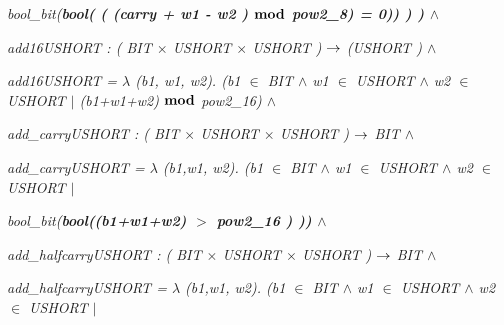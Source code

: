 \documentclass[11pt]{article}
\begin{document}
\begin{sloppypar}
\hspace*{0.60in}\it bool\_bit\rm (\bf bool\rm ( \rm ( \rm (\it carry \rm + \it w1 \rm - \it w2 \rm )  $\mod$  \it pow2\_8\rm ) \rm = \rm 0\rm )\rm ) \rm ) \rm )\hspace*{0.10in} $\land$ 

\hspace*{0.20in}

\hspace*{0.20in}

\hspace*{0.20in}\it add16USHORT \rm : \rm ( \it BIT  $\times$  \it USHORT  $\times$  \it USHORT \rm )  $\fun$  \rm (\it USHORT \rm )  $\land$ 

\hspace*{0.20in}\it add16USHORT \rm =  $\lambda$  \rm (\it b1\rm , \it w1\rm , \it w2\rm )\rm . \rm (\it b1  $\in$  \it BIT  $\land$  \it w1  $\in$  \it USHORT  $\land$  \it w2  $\in$  \it USHORT\hspace*{0.10in} $\mid$ \rm (\it b1\rm +\it w1\rm +\it w2\rm )  $\mod$ \hspace*{0.10in}\it pow2\_16\hspace*{0.10in}\rm )  $\land$ 

\hspace*{0.20in}

\hspace*{0.20in}\it add\_carryUSHORT \rm : \rm ( \it BIT  $\times$  \it USHORT  $\times$  \it USHORT \rm )  $\fun$  \it BIT  $\land$ 

\hspace*{0.20in}\it add\_carryUSHORT \rm =  $\lambda$  \rm (\it b1\rm ,\it w1\rm , \it w2\rm )\rm . \rm (\it b1  $\in$  \it BIT  $\land$  \it w1  $\in$  \it USHORT  $\land$  \it w2  $\in$  \it USHORT\hspace*{0.10in} $\mid$ 

\hspace*{0.40in}\it bool\_bit\rm (\bf bool\rm (\rm (\it b1\rm +\it w1\rm +\it w2\rm ) $>$ \it pow2\_16 \rm ) \rm )\hspace*{0.10in}\rm )  $\land$ 

\hspace*{0.20in}

\hspace*{0.20in}\it add\_halfcarryUSHORT \rm : \rm ( \it BIT  $\times$  \it USHORT  $\times$  \it USHORT \rm )  $\fun$  \it BIT  $\land$ 

\hspace*{0.20in}\it add\_halfcarryUSHORT \rm =  $\lambda$  \rm (\it b1\rm ,\it w1\rm , \it w2\rm )\rm . \rm (\it b1  $\in$  \it BIT  $\land$  \it w1  $\in$  \it USHORT  $\land$  \it w2  $\in$  \it USHORT\hspace*{0.10in} $\mid$  


\end{sloppypar}
\end{document}
